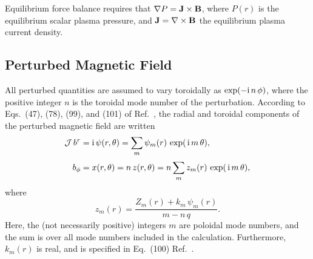 \documentclass[12pt,prb,aps]{revtex4-1}
\begin{document}
Equilibrium force balance requires that
$ \nabla P={\bf J}\times {\bf B}$, 
where $P(r)$ is the equilibrium scalar plasma pressure, and ${\bf J}=\nabla\times {\bf B}$ the equilibrium plasma current density. 

\subsection{Perturbed Magnetic Field}
All perturbed quantities are assumed to vary toroidally as $\exp(-{\rm i}\,n\,\phi)$,
where the positive integer  $n$ is the toroidal mode number of the perturbation. 
According to Eqs.~(47), (78), (99), and (101) of Ref.~, the radial and toroidal components of the perturbed magnetic field are written 
\begin{align}\label{a3}
{\cal J}\,b^r &={\rm i}\,\psi(r,\theta)= \sum_m \psi_m(r)\,\exp(\,{\rm i}\,m\,\theta),\\[0.5ex]
b_\phi &= x(r,\theta)= n\,z(r,\theta) = n\sum_m z_m(r) \,\exp(\,{\rm i}\,m\,\theta),
\end{align}
where
\begin{equation}
z_m(r) = \frac{Z_m(r) + k_m\,\psi_m(r)}{m-n\,q}.
\end{equation}
Here, the (not necessarily positive) integers $m$ are poloidal mode numbers, and the sum is over all mode numbers included in the calculation. 
Furthermore, 
$k_m(r)$ is real, and is specified in Eq.~(100) Ref.~. 
\end{document}
